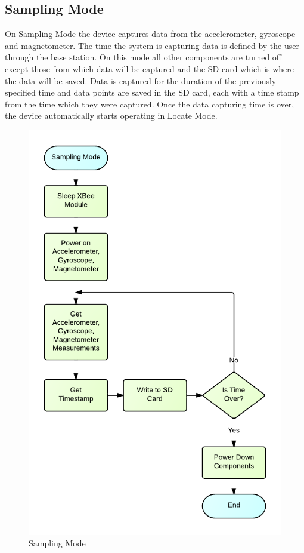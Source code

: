 \subsection{Sampling Mode}
On Sampling Mode the device captures data from the accelerometer, gyroscope and magnetometer. The time the system is capturing data is defined by the user through the base station. On this mode all other components are turned off except those from which data will be captured and the SD card which is where the data will be saved. Data is captured for the duration of the previously specified time and data points are saved in the SD card, each with a time stamp from the time which they were captured. Once the data capturing time is over, the device automatically starts operating in Locate Mode.
\begin{figure}[H]
	\centering
	\includegraphics[scale=1.0]{img/SamplingMode}
	\caption{Sampling Mode \label{fig:samplingMode}}
\end{figure}

